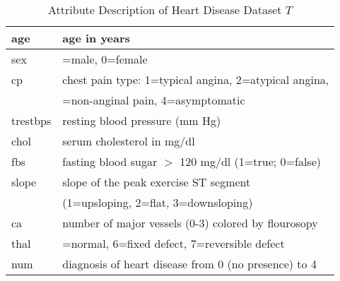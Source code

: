 \documentclass{article}
\begin{document}
\renewcommand{\tabcolsep}{.15cm}
\begin{table}[t]
\caption{Attribute Description of Heart Disease Dataset $T$}
\centering
\renewcommand{\arraystretch}{1.3}
\begin{tabular}{|l | l|}
\hline
\; age& \; age in years \\
\hline
\; sex&\; 1=male, 0=female \\ 
\hline
\; cp &\; chest pain type: 1=typical angina, 2=atypical angina,\\
&\;  3=non-anginal pain, 4=asymptomatic \\
\hline
 \; trestbps&\; resting blood pressure (mm Hg)\\
\hline
\; chol&\; serum cholesterol in mg/dl\\
\hline
 \; fbs&\; fasting blood sugar $>$ 120 mg/dl (1=true; 0=false) \\
\hline
\; slope&\; slope of the peak exercise ST segment \\
         &\; (1=upsloping, 2=flat, 3=downsloping) \\
\hline
 \; ca&\; number of major vessels (0-3) colored by flourosopy \\
\hline
 \; thal&\; 3=normal, 6=fixed defect, 7=reversible defect\\
\hline
 \; num&\; diagnosis of heart disease  from 0 (no presence) to 4\\
\hline 
\end{tabular}
\label{table:map}
\end{table}
\end{document}
